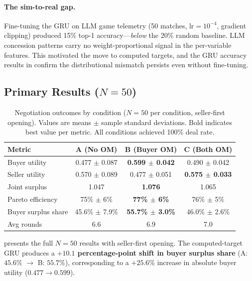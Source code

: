 \documentclass[11pt,a4paper]{article}
\begin{document}
\paragraph{The sim-to-real gap.}
Fine-tuning the GRU on LLM game telemetry (50 matches, $\text{lr} = 10^{-4}$, gradient clipping) produced 15\% top-1 accuracy---\emph{below} the 20\% random baseline. LLM concession patterns carry no weight-proportional signal in the per-variable features. This motivated the move to computed targets, and the GRU accuracy results in  confirm the distributional mismatch persists even without fine-tuning.

\subsection{\texorpdfstring{Primary Results ($N = 50$)}{Primary Results (N = 50)}}

\begin{table}[t]
\centering
\caption{Negotiation outcomes by condition ($N = 50$ per condition, seller-first opening). Values are means $\pm$ sample standard deviations. Bold indicates best value per metric. All conditions achieved 100\% deal rate.}
\label{tab:results}
\begin{tabular}{lccc}
\toprule
Metric & A (No OM) & B (Buyer OM) & C (Both OM) \\
\midrule
Buyer utility       & 0.477 $\pm$ 0.087 & \textbf{0.599 $\pm$ 0.042} & 0.490 $\pm$ 0.042 \\
Seller utility      & 0.570 $\pm$ 0.089 & 0.477 $\pm$ 0.051 & \textbf{0.575 $\pm$ 0.033} \\
Joint surplus       & 1.047 & \textbf{1.076} & 1.065 \\
Pareto efficiency   & 75\% $\pm$ 6\% & \textbf{77\% $\pm$ 6\%} & 76\% $\pm$ 5\% \\
Buyer surplus share & 45.6\% $\pm$ 7.9\% & \textbf{55.7\% $\pm$ 3.0\%} & 46.0\% $\pm$ 2.6\% \\
Avg rounds          & 6.6 & 6.9 & 7.0 \\
\bottomrule
\end{tabular}
\end{table}

 presents the full $N = 50$ results with seller-first opening. The computed-target GRU produces a \textbf{$+10.1$ percentage-point shift in buyer surplus share} (A: $45.6\%$ $\to$ B: $55.7\%$), corresponding to a $+25.6\%$ increase in absolute buyer utility ($0.477 \to 0.599$).
\end{document}
